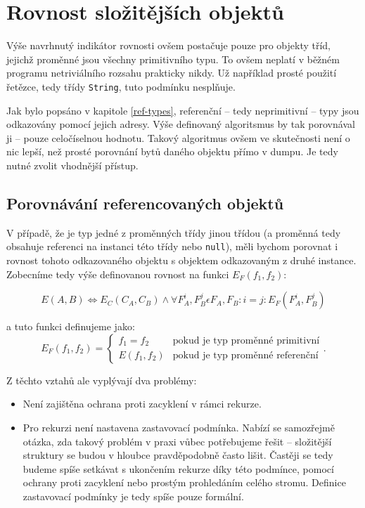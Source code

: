 \section{Rovnost složitějších objektů}
Výše navrhnutý indikátor rovnosti ovšem postačuje pouze pro objekty tříd, jejichž proměnné jsou všechny primitivního typu. To ovšem neplatí v běžném programu netriviálního rozsahu prakticky nikdy. Už například prosté použití řetězce, tedy třídy \texttt{String}, tuto podmínku nesplňuje.

Jak bylo popsáno v kapitole \ref{ref-types}, referenční -- tedy neprimitivní -- typy jsou odkazovány pomocí jejich adresy. Výše definovaný algoritsmus by tak porovnával ji -- pouze celočíselnou hodnotu. Takový algoritmus ovšem ve skutečnosti není o nic lepší, než prosté porovnání bytů daného objektu přímo v dumpu. Je tedy nutné zvolit vhodnější přístup.

\subsection{Porovnávání referencovaných objektů}
V případě, že je typ jedné z proměnných třídy jinou třídou (a proměnná tedy obsahuje referenci na instanci této třídy nebo \texttt{null}), měli bychom porovnat i rovnost tohoto odkazovaného objektu s objektem odkazovaným z druhé instance. Zobecníme tedy výše definovanou rovnost na funkci $E_F(f_1, f_2)$:

\begin{equation}
E(A, B) \Leftrightarrow E_C(C_A, C_B) \wedge \forall F_A^i, F_B^j \epsilon F_A, F_B: i = j: E_F(F_A^i, F_B^j)
\end{equation}

a tuto funkci definujeme jako:
\begin{equation}
    E_F(f_1, f_2)=
      \begin{cases}
        f_1 = f_2 & \text{pokud je typ proměnné primitivní} \\
        E(f_1, f_2) & \text{pokud je typ proměnné referenční}
      \end{cases}.
\end{equation}

Z těchto vztahů ale vyplývají dva problémy:

\begin{itemize}
    \item Není zajištěna ochrana proti zacyklení v rámci rekurze.
    \item Pro rekurzi není nastavena zastavovací podmínka. Nabízí se samozřejmě otázka, zda takový problém v praxi vůbec potřebujeme řešit -- složitější struktury se budou v hloubce pravděpodobně často lišit. Častěji se tedy budeme spíše setkávat s ukončením rekurze díky této podmínce, pomocí ochrany proti zacyklení nebo prostým prohledáním celého stromu. Definice zastavovací podmínky je tedy spíše pouze formální.
\end{itemize}

